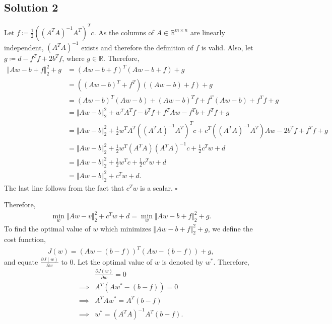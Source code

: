 \subsection*{Solution 2}
Let $f \coloneqq \frac{1}{2}\left((A^TA)^{-1}A^T\right)^Tc$. As the columns of $A \in \mathbb{R}^{m\times n}$ are linearly independent, $(A^TA)^{-1}$ exists and therefore the definition of $f$ is valid. Also, let $g \coloneqq d - f^Tf+2b^Tf$, where $g \in \mathbb{R}$. Therefore,
\begin{align*}
	\Vert Aw -b +f\Vert_2^2 + g &= (Aw-b+f)^T(Aw-b+f)+g\\
	&= ((Aw-b)^T+f^T)((Aw-b)+f)+g\\
	&= (Aw-b)^T(Aw-b)+(Aw-b)^Tf+f^T(Aw-b)+f^Tf+g\\
	&= \Vert Aw-b \Vert_2^2 + w^TA^Tf-b^Tf+f^TAw-f^Tb+f^Tf+g\\
	&= \Vert Aw-b \Vert_2^2 + \frac{1}{2}w^TA^T((A^TA)^{-1}A^T)^Tc + c^T((A^TA)^{-1}A^T)Aw -2b^Tf + f^Tf+g\\
	&= \Vert Aw-b \Vert_2^2 + \frac{1}{2} w^T(A^TA)(A^TA)^{-1}c+\frac{1}{2}c^Tw+d\\
	&= \Vert Aw-b \Vert_2^2 + \frac{1}{2} w^Tc+\frac{1}{2}c^Tw + d\\
	&= \Vert Aw-b \Vert_2^2 + c^Tw + d.
\end{align*}
The last line follows from the fact that $c^Tw$ is a scalar. $\square$

Therefore,
\begin{align*}
	\min_w \Vert Aw-v \Vert_2^2 + c^Tw + d = \min_w \Vert Aw -b + f \Vert_2^2 + g.
\end{align*}
To find the optimal value of $w$ which minimizes $\Vert Aw -b + f \Vert_2^2 + g$, we define the cost function,
\begin{align*}
	J(w) = (Aw-(b-f))^T(Aw-(b-f)) + g,
\end{align*}
and equate $\frac{\partial J(w)}{\partial w}$ to 0. Let the optimal value of $w$ is denoted by $w^*$. Therefore,
\begin{align*}
	& \frac{\partial J(w)}{\partial w} = 0\\
	\implies & A^T(Aw^*-(b-f)) = 0\\
	\implies & A^TAw^* = A^T(b-f)\\
	\implies & w^* = (A^TA)^{-1}A^T(b-f).
\end{align*}